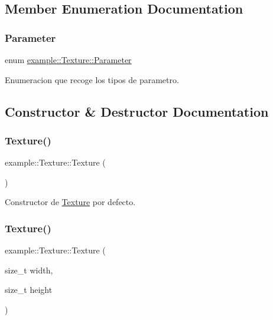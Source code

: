 \subsection{Member Enumeration Documentation}
\mbox{\label{classexample_1_1_texture_a4f7233e69c4a5b913dbe53d729c1765f}} 
\subsubsection{\texorpdfstring{Parameter}{Parameter}}
{\footnotesize\ttfamily enum \mbox{\hyperlink{classexample_1_1_texture_a4f7233e69c4a5b913dbe53d729c1765f}{example\+::\+Texture\+::\+Parameter}}}



Enumeracion que recoge los tipos de parametro. 



\subsection{Constructor \& Destructor Documentation}
\mbox{\label{classexample_1_1_texture_a049d061c48276bea0627a1377cb0f2c6}} 
\subsubsection{\texorpdfstring{Texture()}{Texture()}\hspace{0.1cm}{\footnotesize\ttfamily [1/2]}}
{\footnotesize\ttfamily example\+::\+Texture\+::\+Texture (\begin{DoxyParamCaption}{ }\end{DoxyParamCaption})\hspace{0.3cm}{\ttfamily [default]}}



Constructor de \mbox{\hyperlink{classexample_1_1_texture}{Texture}} por defecto. 

\mbox{\label{classexample_1_1_texture_ab23b9a71fef15550591dd458a17eaad5}} 
\subsubsection{\texorpdfstring{Texture()}{Texture()}\hspace{0.1cm}{\footnotesize\ttfamily [2/2]}}
{\footnotesize\ttfamily example\+::\+Texture\+::\+Texture (\begin{DoxyParamCaption}\item[{size\+\_\+t}]{width,  }\item[{size\+\_\+t}]{height }\end{DoxyParamCaption})\hspace{0.3cm}{\ttfamily [inline]}}



